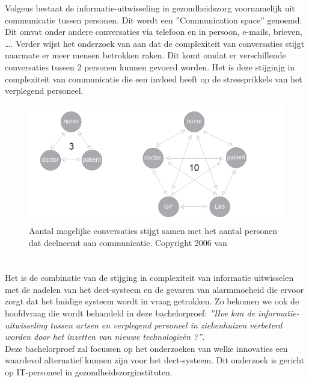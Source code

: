 Volgens \textcite{Coiera2006} bestaat de informatie-uitwisseling in gezondheidszorg voornamelijk uit communicatie tussen personen. Dit wordt een ''Communication space'' genoemd. Dit omvat onder andere conversaties via telefoon en in persoon, e-mails, brieven, \ldots . Verder wijst het onderzoek van \textcite{Coiera2006} aan dat de complexiteit van conversaties stijgt naarmate er meer mensen betrokken raken. Dit komt omdat er verschillende conversaties tussen 2 personen kunnen gevoerd worden. Het is deze stijginjg in complexiteit van communicatie die een invloed heeft op de stressprikkels van het verplegend personeel.

\begin{figure}[H]
  \includegraphics[width=\linewidth]{../graphics/Number-of-conversations.png}
  \caption{Aantal mogelijke conversaties stijgt samen met het aantal personen dat deelneemt aan communicatie. \autocite[Uit ''Communication Systems in Healthcare'' door][The Clinical Biochemist Reviews, 27(2) , 90.]{Coiera2006} Copyright 2006 van \textcite{Coiera2006}}
  \label{fig:aantal conversaties}
\end{figure}

\section{}%
\label{sec:onderzoeksvraag}

Het is de combinatie van de stijging in complexiteit van informatie uitwisselen met de nadelen van het \gls{dect}-systeem en de gevaren van alarmmoeheid die ervoor zorgt dat het huidige systeem wordt in vraag getrokken. Zo bekomen we ook de hoofdvraag die wordt behandeld in deze bachelorproef: \textit{''Hoe kan de informatie-uitwisseling tussen artsen en verplegend personeel in ziekenhuizen verbeterd worden door het inzetten van nieuwe technologieën ?''}.\\
Deze bachelorproef zal focussen op het onderzoeken van welke innovaties een waardevol alternatief kunnen zijn voor het \gls{dect}-systeem. Dit onderzoek is gericht op IT-personeel in gezondheidszorginstituten.\\\\

